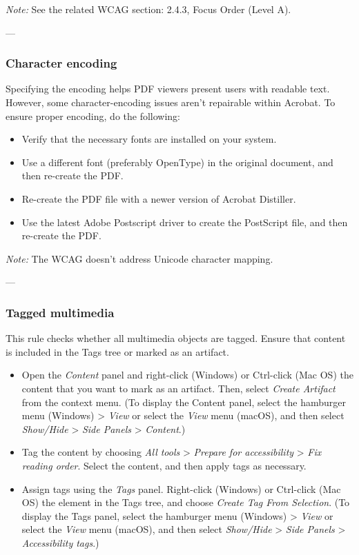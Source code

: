 \vspace{0.5em}
\noindent\textit{Note:} See the related WCAG section: 2.4.3, Focus Order (Level A)\cite{WCAG}.

---

\subsubsection{Character encoding}
Specifying the encoding helps PDF viewers present users with readable text. However, some character-encoding issues aren't repairable within Acrobat\cite{AdobeHelpX}.
To ensure proper encoding, do the following:
\begin{itemize}
    \item Verify that the necessary fonts are installed on your system.
    \item Use a different font (preferably OpenType) in the original document, and then re-create the PDF.
    \item Re-create the PDF file with a newer version of Acrobat Distiller.
    \item Use the latest Adobe Postscript driver to create the PostScript file, and then re-create the PDF.
\end{itemize}

\vspace{0.5em}
\noindent\textit{Note:} The WCAG doesn't address Unicode character mapping\cite{WCAG}.

---

\subsubsection{Tagged multimedia}
This rule checks whether all multimedia objects are tagged. Ensure that content is included in the Tags tree or marked as an artifact\cite{AdobeHelpX}.
\begin{itemize}
    \item Open the \emph{Content} panel and right-click (Windows) or Ctrl-click (Mac OS) the content that you want to mark as an artifact. Then, select \emph{Create Artifact} from the context menu. (To display the Content panel, select the hamburger menu (Windows) > \emph{View} or select the \emph{View} menu (macOS), and then select \emph{Show/Hide} > \emph{Side Panels} > \emph{Content}.)
    \item Tag the content by choosing \emph{All tools} > \emph{Prepare for accessibility} > \emph{Fix reading order}. Select the content, and then apply tags as necessary.
    \item Assign tags using the \emph{Tags} panel. Right-click (Windows) or Ctrl-click (Mac OS) the element in the Tags tree, and choose \emph{Create Tag From Selection}. (To display the Tags panel, select the hamburger menu (Windows) > \emph{View} or select the \emph{View} menu (macOS), and then select \emph{Show/Hide} > \emph{Side Panels} > \emph{Accessibility tags}.)
\end{itemize}


